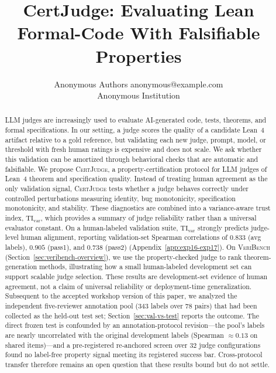 \documentclass{article}
\title{CertJudge: Evaluating Lean Formal-Code With Falsifiable Properties}
\author{\name Anonymous Authors \email anonymous@example.com \\
  \addr Anonymous Institution}
\begin{document}
\maketitle
\begin{abstract}
  LLM judges are increasingly used to evaluate AI-generated code, tests, theorems, and formal specifications. In our setting, a judge scores the quality of a candidate Lean~4 artifact relative to a gold reference, but validating each new judge, prompt, model, or threshold with fresh human ratings is expensive and does not scale. We ask whether this validation can be amortized through behavioral checks that are automatic and falsifiable. We propose \textsc{CertJudge}, a property-certification protocol for LLM judges of Lean~4 theorem and specification quality. Instead of treating human agreement as the only validation signal, \textsc{CertJudge} tests whether a judge behaves correctly under controlled perturbations measuring identity, bug monotonicity, specification monotonicity, and stability. These diagnostics are combined into a variance-aware trust index, \(\mathrm{TI}_{\mathrm{var}}\), which provides a summary of judge reliability rather than a universal evaluator constant. On a human-labeled validation suite, \(\mathrm{TI}_{\mathrm{var}}\) strongly predicts judge-level human alignment, reporting validation-set Spearman correlations of \(0.833\) (avg labels), \(0.905\) (pass1), and \(0.738\) (pass2) (Appendix~\ref{app:exp16-exp17}). On \textsc{VeriBench} (Section~\ref{sec:veribench-overview}), we use the property-checked judge to rank theorem-generation methods, illustrating how a small human-labeled development set can support scalable judge selection. These results are development-set evidence of human agreement, not a claim of universal reliability or deployment-time generalization. Subsequent to the accepted workshop version of this paper, we analyzed the independent five-reviewer annotation pool (\(343\) labels over \(78\) pairs) that had been collected as the held-out test set; Section~\ref{sec:val-vs-test} reports the outcome. The direct frozen test is confounded by an annotation-protocol revision---the pool's labels are nearly uncorrelated with the original development labels (Spearman \(\approx 0.13\) on shared items)---and a pre-registered re-anchored screen over \(32\) judge configurations found no label-free property signal meeting its registered success bar. Cross-protocol transfer therefore remains an open question that these results bound but do not settle.


\end{abstract}
\end{document}
